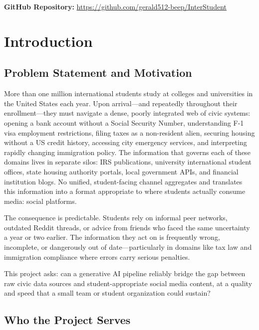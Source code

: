 \documentclass[12pt, letterpaper]{article}
\begin{document}
\textbf{GitHub Repository:}
\url{https://github.com/gerald512-beep/InterStudent}

\newpage

\section{Introduction}

\subsection{Problem Statement and Motivation}

More than one million international students study at colleges and universities in the
United States each year. Upon arrival---and repeatedly throughout their enrollment---they
must navigate a dense, poorly integrated web of civic systems: opening a bank account
without a Social Security Number, understanding F-1 visa employment restrictions,
filing taxes as a non-resident alien, securing housing without a US credit history,
accessing city emergency services, and interpreting rapidly changing immigration policy.
The information that governs each of these domains lives in separate silos: IRS
publications, university international student offices, state housing authority portals,
local government APIs, and financial institution blogs. No unified, student-facing
channel aggregates and translates this information into a format appropriate to where
students actually consume media: social platforms.

The consequence is predictable. Students rely on informal peer networks, outdated
Reddit threads, or advice from friends who faced the same uncertainty a year or two
earlier. The information they act on is frequently wrong, incomplete, or dangerously
out of date---particularly in domains like tax law and immigration compliance where
errors carry serious penalties.

This project asks: can a generative AI pipeline reliably bridge the gap between raw
civic data sources and student-appropriate social media content, at a quality and
speed that a small team or student organization could sustain?

\subsection{Who the Project Serves}
\end{document}
